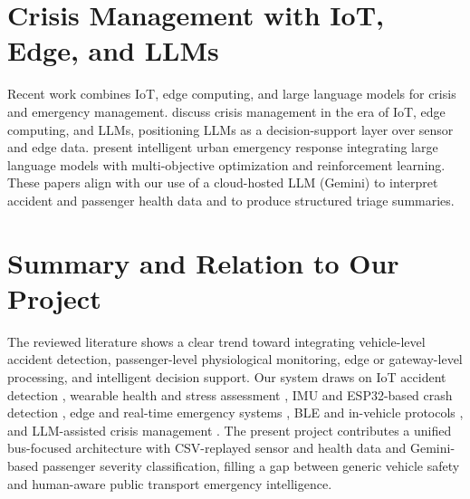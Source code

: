 \documentclass[conference]{IEEEtran}
\begin{document}
\section{Crisis Management with IoT, Edge, and LLMs}

Recent work combines IoT, edge computing, and large language models for crisis and emergency management. \cite{ieee_crisis_iot_edge_llm} discuss crisis management in the era of IoT, edge computing, and LLMs, positioning LLMs as a decision-support layer over sensor and edge data. \cite{ieee_urban_emergency_llm} present intelligent urban emergency response integrating large language models with multi-objective optimization and reinforcement learning. These papers align with our use of a cloud-hosted LLM (Gemini) to interpret accident and passenger health data and to produce structured triage summaries.

\section{Summary and Relation to Our Project}

The reviewed literature shows a clear trend toward integrating vehicle-level accident detection, passenger-level physiological monitoring, edge or gateway-level processing, and intelligent decision support. Our system draws on IoT accident detection \cite{ieee_bus_mgmt,ieee_comprehensive_iot_accident,ieee_iot_accident_emergency}, wearable health and stress assessment \cite{ieee_smart_wearable_medical,ieee_wearable_jacket,ieee_hrv_stress_wearable,ieee_esp32_stress}, IMU and ESP32-based crash detection \cite{ieee_crash_imu,ieee_esp32_deep}, edge and real-time emergency systems \cite{ieee_edge_mission,ieee_portable_edge_disaster,ieee_realtime_iot_safety}, BLE and in-vehicle protocols \cite{ieee_ble_automobile,ieee_ble_intra_vehicle,ieee_intra_vehicular_iot}, and LLM-assisted crisis management \cite{ieee_crisis_iot_edge_llm,ieee_urban_emergency_llm}. The present project contributes a unified bus-focused architecture with CSV-replayed sensor and health data and Gemini-based passenger severity classification, filling a gap between generic vehicle safety and human-aware public transport emergency intelligence.
\end{document}
